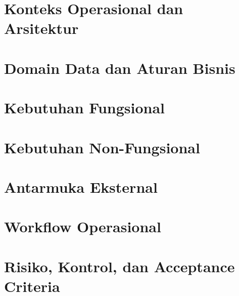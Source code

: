 \documentclass[12pt,a4paper]{article}
\begin{document}
\section{Konteks Operasional dan Arsitektur}

\clearpage

\section{Domain Data dan Aturan Bisnis}

\clearpage

\section{Kebutuhan Fungsional}

\clearpage

\section{Kebutuhan Non-Fungsional}

\clearpage

\section{Antarmuka Eksternal}

\clearpage

\section{Workflow Operasional}

\clearpage

\section{Risiko, Kontrol, dan Acceptance Criteria}

\clearpage
\end{document}
